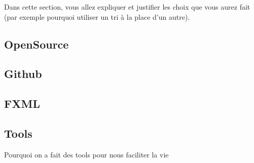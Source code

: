 \documentclass[../main.tex]{subfiles}
\begin{document}
Dans cette section, vous allez expliquer et justifier les choix que vous aurez fait (par exemple pourquoi utiliser un tri à la place d'un autre).

\subsection{OpenSource}

\subsection{Github}

\subsection{FXML}

\subsection{Tools}
Pourquoi on a fait des tools pour nous faciliter la vie
\end{document}
